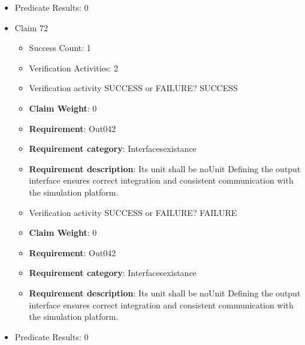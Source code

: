 \documentclass{article}
\begin{document}
\begin{itemize}
\begin{itemize}
					\item Verification activity SUCCESS or FAILURE? FAILURE
					\item \textbf{Claim Weight}: 0
						\item \textbf{Requirement}: Out041 
						\item \textbf{Requirement category}: Interfacesexistance 
						\item \textbf{Requirement description}: Its unit shall be Nm Defining the output interface ensures correct integration and consistent communication with the simulation platform.
					
				\end{itemize}
				
									    
				\item Predicate Results: 0

  				  \item Claim 72
				\begin{itemize}
			    	\item Success Count: 1 
			    	\item Verification Activities: 2
					\item Verification activity SUCCESS or FAILURE? SUCCESS
					\item \textbf{Claim Weight}: 0
						\item \textbf{Requirement}: Out042 
						\item \textbf{Requirement category}: Interfacesexistance 
						\item \textbf{Requirement description}: Its unit shall be noUnit Defining the output interface ensures correct integration and consistent communication with the simulation platform.
					
					\item Verification activity SUCCESS or FAILURE? FAILURE
					\item \textbf{Claim Weight}: 0
						\item \textbf{Requirement}: Out042 
						\item \textbf{Requirement category}: Interfacesexistance 
						\item \textbf{Requirement description}: Its unit shall be noUnit Defining the output interface ensures correct integration and consistent communication with the simulation platform.
					
				\end{itemize}
				
									    
				\item Predicate Results: 0


\end{itemize}
\end{document}

